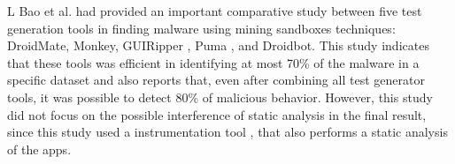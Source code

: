 L Bao et al. \cite{DBLP:conf/wcre/BaoLL18} had provided an important comparative study between five test generation tools in finding malware using mining sandboxes techniques: DroidMate, Monkey, GUIRipper \cite{DBLP:conf/kbse/AmalfitanoFTCM12}, Puma \cite{DBLP:conf/mobisys/Hao0NHG14}, and Droidbot. This study indicates that these tools was efficient in identifying at most 70\% of the malware in a specific dataset and also reports that, even after combining all test generator tools, it was possible to detect 80\% of malicious behavior. However, this study did not focus on the possible interference of static analysis in the final result, since this study used a instrumentation tool \cite{DBLP:conf/icsm/CaiR17a}, that also performs a static analysis of the apps.